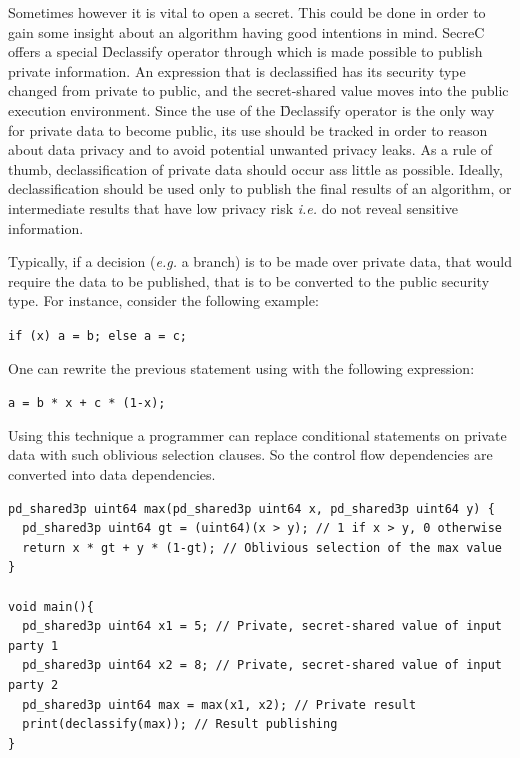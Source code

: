 Sometimes however it is vital to open a secret.
This could be done in order to gain some insight about an algorithm having good intentions in mind.
SecreC offers a special \f{Declassify} operator through which is made possible to publish private information.
An expression that is declassified has its security type changed from private to public, and the secret\hyp shared value moves into the public execution environment.
Since the use of the \f{Declassify} operator is the only way for private data to become public, its use should be tracked in order to reason about data privacy and to avoid potential unwanted privacy leaks.
As a rule of thumb, declassification of private data should occur ass little as possible.
Ideally, declassification should be used only to publish the final results of an algorithm, or intermediate results that have low privacy risk \textit{i.e.} do not reveal sensitive information.

Typically, if a decision (\textit{e.g.} a branch) is to be made over private data, that would require the data to be published, that is to be converted to the public security type.
For instance, consider the following example:

\texttt{if (x) a = b; else a = c; }

One can rewrite the previous statement using with the following expression:

\texttt{a = b * x + c * (1-x); }

Using this technique a programmer can replace conditional statements on private data with such oblivious selection clauses.
So the control flow dependencies are converted into data dependencies.

{
\begin{verbatim}
pd_shared3p uint64 max(pd_shared3p uint64 x, pd_shared3p uint64 y) {
  pd_shared3p uint64 gt = (uint64)(x > y); // 1 if x > y, 0 otherwise
  return x * gt + y * (1-gt); // Oblivious selection of the max value
}

void main(){
  pd_shared3p uint64 x1 = 5; // Private, secret-shared value of input party 1
  pd_shared3p uint64 x2 = 8; // Private, secret-shared value of input party 2
  pd_shared3p uint64 max = max(x1, x2); // Private result
  print(declassify(max)); // Result publishing
}
\end{verbatim}
\label{l:millionaires}
}

